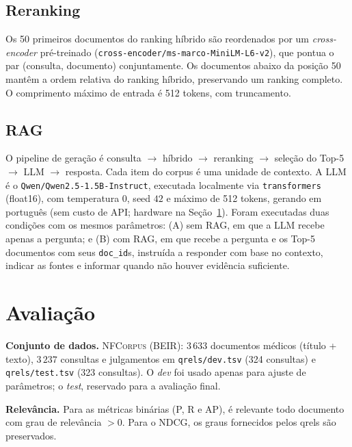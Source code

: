 \documentclass[9pt,a4paper,twocolumn]{article}
\newcommand{\ndcg}{\textsc{NDCG}}
\begin{document}
\subsection{Reranking}
Os 50 primeiros documentos do ranking híbrido são reordenados por um \textit{cross-encoder}
pré-treinado (\texttt{cross-encoder/ms-marco-MiniLM-L6-v2}), que pontua o par
(consulta, documento) conjuntamente. Os documentos abaixo da posição 50 mantêm a ordem relativa do
ranking híbrido, preservando um ranking completo. O comprimento máximo de entrada é 512 tokens,
com truncamento.

\subsection{RAG}
O pipeline de geração é consulta $\rightarrow$ híbrido $\rightarrow$ reranking $\rightarrow$
seleção do Top-5 $\rightarrow$ LLM $\rightarrow$ resposta. Cada item do corpus é uma unidade de
contexto. A LLM é o \texttt{Qwen/Qwen2.5-1.5B-Instruct}, executada localmente via
\texttt{transformers} (float16), com temperatura $0$, seed $42$ e máximo de 512 tokens, gerando em
português (sem custo de API; hardware na Seção~\ref{avaliacao}). Foram executadas duas condições com os mesmos parâmetros: (A) sem RAG, em que a LLM
recebe apenas a pergunta; e (B) com RAG, em que recebe a pergunta e os Top-5 documentos com seus
\texttt{doc\_id}s, instruída a responder com base no contexto, indicar as fontes e informar quando
não houver evidência suficiente.

\section{Avaliação}\label{avaliacao}

\textbf{Conjunto de dados.} \textsc{NFCorpus} (BEIR): $3\,633$ documentos médicos (título +
texto), $3\,237$ consultas e julgamentos em \texttt{qrels/dev.tsv} (324 consultas) e
\texttt{qrels/test.tsv} (323 consultas). O \emph{dev} foi usado apenas para ajuste de parâmetros;
o \emph{test}, reservado para a avaliação final.

\textbf{Relevância.} Para as métricas binárias (P, R e AP), é relevante todo documento com grau de
relevância $>0$. Para o \ndcg{}, os graus fornecidos pelos qrels são preservados.
\end{document}
